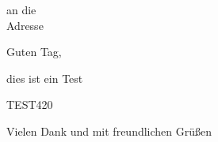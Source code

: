 \documentclass[a4paper,12pt]{scrlttr2}
\begin{document}
\begin{letter}{
an die \\
Adresse\\
}

\opening{Guten Tag,}

dies ist ein Test

TEST420\cite{gdpr}


\closing{Vielen Dank und mit freundlichen Grü\ss en}


\end{letter}
\end{document}
